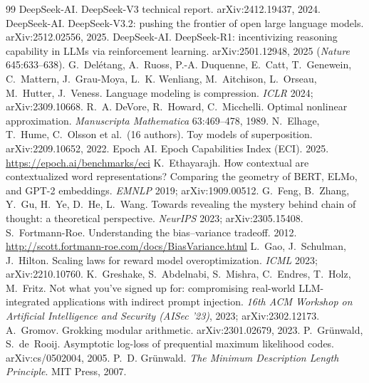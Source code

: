 \begin{thebibliography}{99}
 DeepSeek-AI. DeepSeek-V3 technical report. arXiv:2412.19437, 2024.
 DeepSeek-AI. DeepSeek-V3.2: pushing the frontier of open large language models. arXiv:2512.02556, 2025.
 DeepSeek-AI. DeepSeek-R1: incentivizing reasoning capability in LLMs via reinforcement learning. arXiv:2501.12948, 2025 (\emph{Nature} 645:633--638).
 G.~Del{\'e}tang, A.~Ruoss, P.-A. Duquenne, E.~Catt, T.~Genewein, C.~Mattern, J.~Grau-Moya, L.~K. Wenliang, M.~Aitchison, L.~Orseau, M.~Hutter, J.~Veness. Language modeling is compression. \emph{ICLR} 2024; arXiv:2309.10668.
 R.~A. DeVore, R.~Howard, C.~Micchelli. Optimal nonlinear approximation. \emph{Manuscripta Mathematica} 63:469--478, 1989.
 N.~Elhage, T.~Hume, C.~Olsson et al.\ (16 authors). Toy models of superposition. arXiv:2209.10652, 2022.
 Epoch AI. Epoch Capabilities Index (ECI). 2025. \url{https://epoch.ai/benchmarks/eci}
 K.~Ethayarajh. How contextual are contextualized word representations? Comparing the geometry of BERT, ELMo, and GPT-2 embeddings. \emph{EMNLP} 2019; arXiv:1909.00512.
 G.~Feng, B.~Zhang, Y.~Gu, H.~Ye, D.~He, L.~Wang. Towards revealing the mystery behind chain of thought: a theoretical perspective. \emph{NeurIPS} 2023; arXiv:2305.15408.
 S.~Fortmann-Roe. Understanding the bias--variance tradeoff. 2012. \url{http://scott.fortmann-roe.com/docs/BiasVariance.html}
 L.~Gao, J.~Schulman, J.~Hilton. Scaling laws for reward model overoptimization. \emph{ICML} 2023; arXiv:2210.10760.
 K.~Greshake, S.~Abdelnabi, S.~Mishra, C.~Endres, T.~Holz, M.~Fritz. Not what you've signed up for: compromising real-world LLM-integrated applications with indirect prompt injection. \emph{16th ACM Workshop on Artificial Intelligence and Security (AISec '23)}, 2023; arXiv:2302.12173.
 A.~Gromov. Grokking modular arithmetic. arXiv:2301.02679, 2023.
 P.~Gr\"unwald, S.~de~Rooij. Asymptotic log-loss of prequential maximum likelihood codes. arXiv:cs/0502004, 2005.
 P.~D. Gr\"unwald. \emph{The Minimum Description Length Principle}. MIT Press, 2007.

\end{thebibliography}
